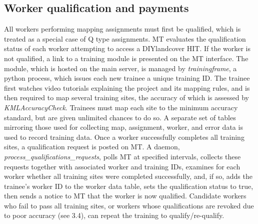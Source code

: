\documentclass[preprint,12pt,authoryear]{elsarticle}
\begin{document}


\subsection{Worker qualification and payments}
All workers performing mapping assignments must first be qualified, which is treated as a special case of Q type assignments. MT evaluates the qualification status of each worker attempting to access a DIYlandcover HIT. If the worker is not qualified, a link to a training module is presented on the MT interface. The module, which is hosted on the main server, is managed by \emph{trainingframe}, a python process, which issues each new trainee a unique training ID. The trainee first watches video tutorials explaining the project and its mapping rules, and is then required to map several training sites, the accuracy of which is assessed by \emph{KMLAccuracyCheck}. Trainees must map each site to the minimum accuracy standard, but are given unlimited chances to do so. A separate set of tables mirroring those used for collecting map, assignment, worker, and error data is used to record training data. Once a worker successfully completes all training sites, a qualification request is posted on MT.  A daemon, \emph{process\_qualifications\_requests}, polls MT at specified intervals, collects these requests together with associated worker and training IDs, examines for each worker whether all training sites were completed successfully, and, if so, adds the trainee's worker ID to the worker data table, sets the qualification status to true, then sends a notice to MT that the worker is now qualified. Candidate workers who fail to pass all training sites, or workers whose qualifications are revoked due to poor accuracy (see 3.4), can repeat the training to qualify/re-qualify. 

\end{document}
